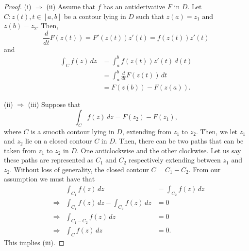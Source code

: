 \documentclass[12pt]{book}
\begin{document}
\begin{proof}
    (i) $\Rightarrow$ (ii)
    Assume that $f$ has an antiderivative $F$ in $D$. Let $C: z(t), t \in [a , b]$ be a contour lying in $D$ such that $z(a) = z_1$ and $z(b) = z_2.$ Then, 
    \[
        \frac{d}{dt} F(z(t)) = F'(z(t))z'(t) = f(z(t))z'(t)
    \]
    and
    \begin{align*}
        \int_{C} f(z)\,dz
            &=
                \int_{a}^{b} f(z(t))z'(t)\,d(t) \\
            &=
                \int_{a}^{b} \frac{d}{dt}F(z(t))\,dt \\
            &=
                F(z(b)) - F(z(a)).
    \end{align*}
    
    \noindent (ii) $\Rightarrow$ (iii)
    Suppose that 
    \[
        \int_{C} f(z)\,dz = F(z_2) - F(z_1),
    \]
    where $C$ is a smooth contour lying in $D$, extending from $z_1$ to $z_2$. Then, we let $z_1$ and $z_2$ lie on a closed contour $C$ in $D.$ Then, there can be two paths that can be taken from $z_1$ to $z_2$ in $D$. One anticlockwise and the other clockwise. Let us say these paths are represented as $C_1$ and $C_2$ respectively extending between $z_1$ and $z_2$. Without loss of generality, the closed contour $C = C_1 - C_2.$ From our assumption we must have that
    \begin{align*} 
        &
            &\int_{C_{1}} f(z)\,dz 
                &=
                    \int_{C_2} f(z)\,dz \\
        &\Rightarrow 
            &\int_{C_{1}}f(z)\,dz - \int_{C_2} f(z)\,dz
                &=
                    0 \\
        &\Rightarrow 
            &\int_{C_1 - C_2} f(z)\,dz
                &=
                    0 \\
        &\Rightarrow
            &\int_{C} f(z)\,dz
                &=
                    0.
    \end{align*}
    This implies (iii).


\end{proof}
\end{document}
